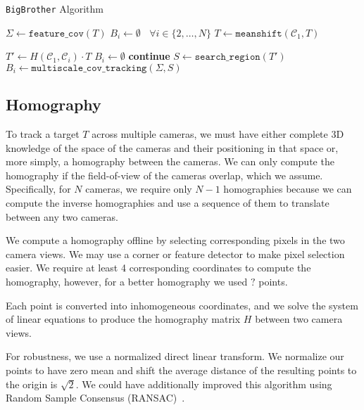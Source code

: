 \documentclass{article}
\begin{document}
\begin{algorithm}
\caption{\texttt{BigBrother} Algorithm}\label{algo:bigbrother}
\begin{algorithmic}[1]
\State $\Sigma\gets \mathtt{feature\_cov}(T)$
\State $B_i\gets\emptyset~~~~\forall i\in\{2,\dots,N\}$
    \State $T\gets \mathtt{meanshift}(\mathcal{C}_1, T)$

        \State $T'\gets H(\mathcal{C}_1, \mathcal{C}_i)\cdot T$
            \State $B_i\gets\emptyset$
            \State \textbf{continue}
        \EndIf
        \State $S\gets\mathtt{search\_region}(T')$
        \State $B_i\gets\mathtt{multiscale\_cov\_tracking}(\Sigma, S)$
    \EndFor
\EndWhile
\EndProcedure
\end{algorithmic}
\end{algorithm}

\subsection{Homography}
\label{sec:homography}
To track a target $T$ across multiple cameras, we must have either complete 3D knowledge of the space of the cameras and their positioning in that space or, more simply, a homography between the cameras. We can only compute the homography if the field-of-view of the cameras overlap, which we assume. Specifically, for $N$ cameras, we require only $N-1$ homographies because we can compute the inverse homographies and use a sequence of them to translate between any two cameras.

We compute a homography offline by selecting corresponding pixels in the two camera views. We may use a corner or feature detector to make pixel selection easier. We require at least 4 corresponding coordinates to compute the homography, however, for a better homography we used $?$ points.

Each point is converted into inhomogeneous coordinates, and we solve the system of linear equations to produce the homography matrix $H$ between two camera views.

For robustness, we use a normalized direct linear transform. We normalize our points to have zero mean and shift the average distance of the resulting points to the origin is $\sqrt{2}$. We could have additionally improved this algorithm using Random Sample Consensus (RANSAC)~\cite{fischler1981random}.
\end{document}
